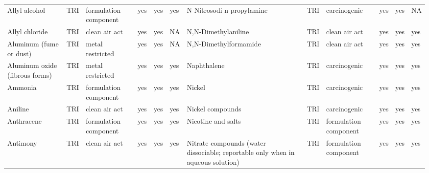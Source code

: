 \begin{table}[H]
{\begin{tabular}{llllllllllll}
            Allyl alcohol                                                              & TRI            & formulation component & yes    & yes     & yes  & N-Nitrosodi-n-propylamine                                                                                          & TRI & carcinogenic & yes & yes & NA\\
            Allyl chloride                                                             & TRI            & clean air act         & yes    & yes     & NA   & N,N-Dimethylaniline                                                                                                & TRI            & clean air act & yes & yes & yes\\
            Aluminum (fume or dust)                                                    & TRI            & metal restricted      & yes    & yes     & NA   & N,N-Dimethylformamide                                                                                              & TRI & clean air act & yes & yes & yes\\
            Aluminum oxide (fibrous forms)                                             & TRI            & metal restricted      & yes    & yes     & yes  & Naphthalene                                                                                                        & TRI            & carcinogenic & yes & yes & yes\\
            Ammonia                                                                    & TRI            & formulation component & yes    & yes     & yes  & Nickel                                                                                                             & TRI            & carcinogenic          & yes    & yes     & yes  \\
            Aniline                                                                    & TRI            & clean air act         & yes    & yes     & yes  & Nickel compounds                                                                                                   & TRI            & carcinogenic          & yes    & yes     & yes  \\
            Anthracene                                                                 & TRI            & formulation component & yes    & yes     & yes  & Nicotine and salts                                                                                                 & TRI            & formulation component & yes & yes & yes\\
            Antimony                                                                   & TRI            & clean air act         & yes    & yes     & yes  & Nitrate compounds (water dissociable; reportable only when in aqueous solution) & TRI & formulation component & yes & yes & yes\\

\end{tabular}}
\end{table}
